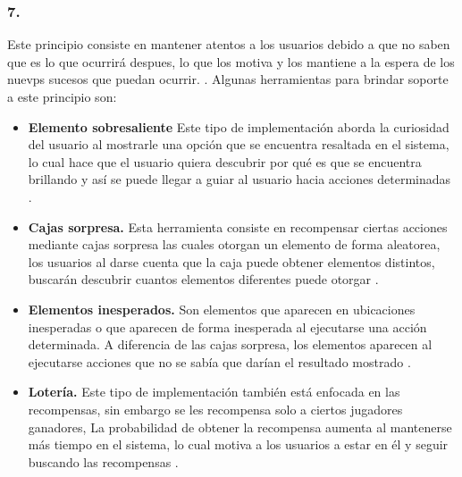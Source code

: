 \subsubsection{7. \principioVII}
\label{subsec:principioVII}

 Este principio consiste en mantener atentos a los usuarios debido a que no saben que es lo que
 ocurrirá despues, lo que los motiva y los mantiene a la espera de los nuevps sucesos que puedan
 ocurrir. \cite[pp. 27, 273]{Octalysis}. Algunas herramientas para brindar soporte a este
 principio son:
       
    \begin{itemize}
    \item
    {\bf Elemento sobresaliente} %
        Este tipo de implementación aborda la curiosidad del usuario al mostrarle una opción
        que se encuentra resaltada en el sistema, lo cual hace que el usuario quiera descubrir
        por qué es que se encuentra brillando y así se puede llegar a guiar al usuario hacia
        acciones determinadas \cite[p. 297]{Octalysis}.
           
    \item
    {\bf Cajas sorpresa.}
        Esta herramienta consiste en recompensar ciertas acciones mediante cajas sorpresa
        las cuales otorgan un elemento de forma aleatorea, los usuarios al darse cuenta que
        la caja puede obtener elementos distintos, buscarán descubrir cuantos elementos diferentes
        puede otorgar \cite[p. 299]{Octalysis}.
           
    \item
    {\bf Elementos inesperados.} %
        Son elementos que aparecen en ubicaciones inesperadas o que aparecen de forma inesperada
        al ejecutarse una acción determinada. A diferencia de las cajas sorpresa, los elementos
        aparecen al ejecutarse acciones que no se sabía que darían el resultado mostrado
        \cite[p. 301]{Octalysis}.
           
    \item
    {\bf Lotería.}
        Este tipo de implementación también está enfocada en las recompensas, sin embargo se les
        recompensa solo a ciertos jugadores ganadores, La probabilidad de obtener la recompensa
        aumenta al mantenerse más tiempo en el sistema, lo cual motiva a los usuarios
        a estar en él y seguir buscando las recompensas \cite[p. 305]{Octalysis}.
    \end{itemize}

